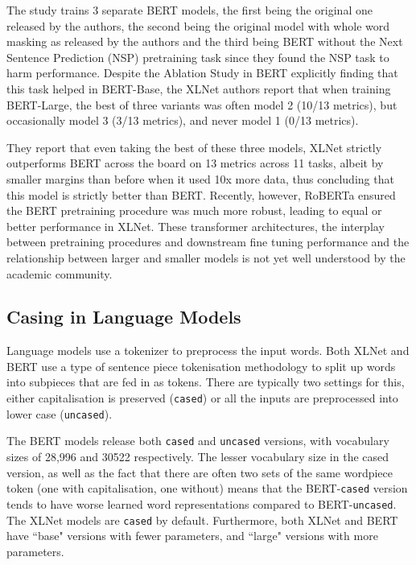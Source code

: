 {{The study trains 3 separate BERT models, the first being the original one released by the authors, the second being the original model with whole word masking as released by the authors and the third being BERT without the Next Sentence Prediction (NSP) pretraining task since they found the NSP task to harm performance. Despite the Ablation Study in BERT explicitly finding that this task helped in BERT-Base, the XLNet authors report that when training BERT-Large, the best of three variants was often model 2 (10/13 metrics), but occasionally model 3 (3/13 metrics), and never model 1 (0/13 metrics).

They report that even taking the best of these three models, XLNet strictly outperforms BERT across the board on 13 metrics across 11 tasks, albeit by smaller margins than before when it used 10x more data, thus concluding that this model is strictly better than BERT. Recently, however, RoBERTa \cite{Liu2019} ensured the BERT pretraining procedure was much more robust, leading to equal or better performance in XLNet. These transformer architectures, the interplay between pretraining procedures and downstream fine tuning performance and the relationship between larger and smaller models is not yet well understood by the academic community.

\subsection{Casing in Language Models} \label{section:background:casing}
Language models use a tokenizer to preprocess the input words. Both XLNet and BERT use a type of sentence piece tokenisation methodology to split up words into subpieces that are fed in as tokens. There are typically two settings for this, either capitalisation is preserved (\texttt{cased}) or all the inputs are preprocessed into lower case (\texttt{uncased}).

The BERT models release both \texttt{cased} and \texttt{uncased} versions, with vocabulary sizes of 28,996 and 30522 respectively. The lesser vocabulary size in the cased version, as well as the fact that there are often two sets of the same wordpiece token (one with capitalisation, one without) means that the BERT-\texttt{cased} version tends to have worse learned word representations compared to BERT-\texttt{uncased}. The XLNet models are \texttt{cased} by default. Furthermore, both XLNet and BERT have ``base" versions with fewer parameters, and ``large" versions with more parameters.

}}
